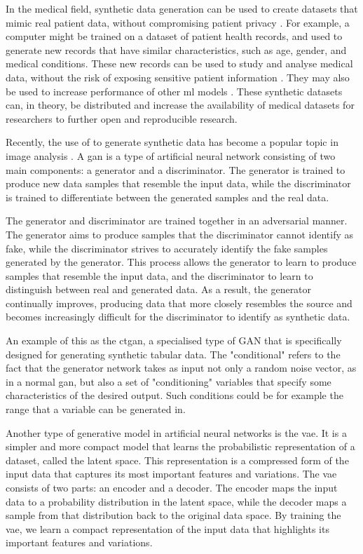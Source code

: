 \documentclass[12pt, a4paper]{article}
\begin{document}
In the medical field, synthetic data generation can be used to create datasets that mimic real patient data, without compromising patient privacy \cite{liu_ppgan_2019}. For example, a computer might be trained on a dataset of patient health records, and used to generate new records that have similar characteristics, such as age, gender, and medical conditions. These new records can be used to study and analyse medical data, without the risk of exposing sensitive patient information \cite{liu_ppgan_2019}. They may also be used to increase performance of other \acrshort{ml} models \cite{chen_synthetic_2021}. These synthetic datasets can, in theory, be distributed and increase the availability of medical datasets for researchers to further open and reproducible research.

Recently, the use of  to generate synthetic data has become a popular topic in image analysis \cite{pavan_kumar_generative_2021}.  A \acrshort{gan} is a type of artificial neural network consisting of two main components: a generator and a discriminator. The generator is trained to produce new data samples that resemble the input data, while the discriminator is trained to differentiate between the generated samples and the real data. \cite{pavan_kumar_generative_2021}

The generator and discriminator are trained together in an adversarial manner. The generator aims to produce samples that the discriminator cannot identify as fake, while the discriminator strives to accurately identify the fake samples generated by the generator. This process allows the generator to learn to produce samples that resemble the input data, and the discriminator to learn to distinguish between real and generated data. As a result, the generator continually improves, producing data that more closely resembles the source and becomes increasingly difficult for the discriminator to identify as synthetic data. \cite{pavan_kumar_generative_2021}

An example of this as the \acrfull{ctgan}, a specialised type of GAN that is specifically designed for generating synthetic tabular data. The "conditional" refers to the fact that the generator network takes as input not only a random noise vector, as in a normal \acrshort{gan}, but also a set of "conditioning" variables that specify some characteristics of the desired output. Such conditions could be for example the range that a variable can be generated in. \cite{xu_modeling_2019}

Another type of generative model in artificial neural networks is the \acrfull{vae}. It is a simpler and more compact model that learns the probabilistic representation of a dataset, called the latent space. This representation is a compressed form of the input data that captures its most important features and variations. The \acrshort{vae} consists of two parts: an encoder and a decoder. The encoder maps the input data to a probability distribution in the latent space, while the decoder maps a sample from that distribution back to the original data space. By training the \acrshort{vae}, we learn a compact representation of the input data that highlights its important features and variations. \cite{kingma_auto-encoding_2013}
\end{document}
